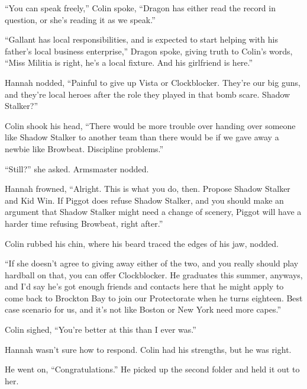 ``You can speak freely,'' Colin spoke, ``Dragon has either read the record in question, or she's reading it as we speak.''



``Gallant has local responsibilities, and is expected to start helping with his father's local business enterprise,'' Dragon spoke, giving truth to Colin's words, ``Miss Militia is right, he's a local fixture.  And his girlfriend is here.''



Hannah nodded, ``Painful to give up Vista or Clockblocker.  They're our big guns, and they're local heroes after the role they played in that bomb scare.  Shadow Stalker?''



Colin shook his head, ``There would be more trouble over handing over someone like Shadow Stalker to another team than there would be if we gave away a newbie like Browbeat.  Discipline problems.''



``Still?'' she asked.  Armsmaster nodded.



Hannah frowned, ``Alright.  This is what you do, then.  Propose Shadow Stalker and Kid Win.  If Piggot does refuse Shadow Stalker, and you should make an argument that Shadow Stalker might need a change of scenery, Piggot will have a harder time refusing Browbeat, right after.''



Colin rubbed his chin, where his beard traced the edges of his jaw, nodded.



``If she doesn't agree to giving away either of the two, and you really should play hardball on that, you can offer Clockblocker.  He graduates this summer, anyways, and I'd say he's got enough friends and contacts here that he might apply to come back to Brockton Bay to join our Protectorate when he turns eighteen.  Best case scenario for us, and it's not like Boston or New York need more capes.''



Colin sighed, ``You're better at this than I ever was.''



Hannah wasn't sure how to respond.  Colin had his strengths, but he was right.



He went on, ``Congratulations.''  He picked up the second folder and held it out to her.



